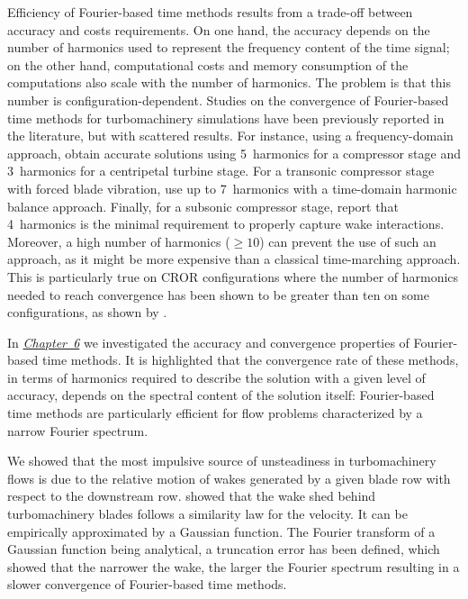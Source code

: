Efficiency of Fourier-based time methods results 
from a trade-off between accuracy and 
costs requirements.
On one hand, the accuracy depends on the number of harmonics
used to represent the frequency content of the time 
signal; on the other hand, computational costs and 
memory consumption of the computations also scale
with the number of harmonics. 
The problem is that this number is 
configuration-dependent. 
Studies on the convergence of 
Fourier-based time methods for turbomachinery simulations 
have been previously reported in the literature, but with scattered results. 
For instance, using a frequency-domain approach, 
\citet{Vilmin2006} obtain accurate solutions 
using 5~harmonics for a compressor stage and 3~harmonics for a 
centripetal turbine stage. For a transonic compressor stage with 
forced blade vibration, \citet{ekici2010} use 
up to 7~harmonics with a time-domain harmonic balance approach. Finally, for a 
subsonic compressor stage, \citet{JSicot2012} report 
that 4~harmonics is the minimal requirement to properly capture wake interactions.
Moreover, a high number of harmonics
($\geq 10$) can prevent the use of such an approach,
as it might be more expensive than a classical time-marching approach.
This is particularly true on CROR configurations where the number
of harmonics needed to reach convergence
has been shown to be greater than ten
on some configurations, as shown by \citet{ThesisFrancois}.

In \hyperref[cha:limitations_convergence]{\emph{Chapter~6}}
we investigated the accuracy and convergence properties 
of Fourier-based time methods. It is highlighted that the convergence rate 
of these methods, in terms of harmonics required to describe the solution 
with a given level of accuracy, depends on the spectral content of the 
solution itself: Fourier-based time methods are particularly efficient 
for flow problems characterized by a narrow Fourier 
spectrum. 

We showed that the most impulsive source of unsteadiness in 
turbomachinery flows is due to the relative motion of wakes 
generated by a given blade row with respect to the downstream row.
\citet{Lakshminarayana1980} showed that the wake shed
behind turbomachinery blades follows a similarity law for the velocity. 
It can be empirically approximated by a Gaussian function.
The Fourier transform of a Gaussian function being analytical,
a truncation error has been defined, which showed that the narrower the wake, 
the larger the Fourier spectrum resulting in a slower convergence 
of Fourier-based time methods.

